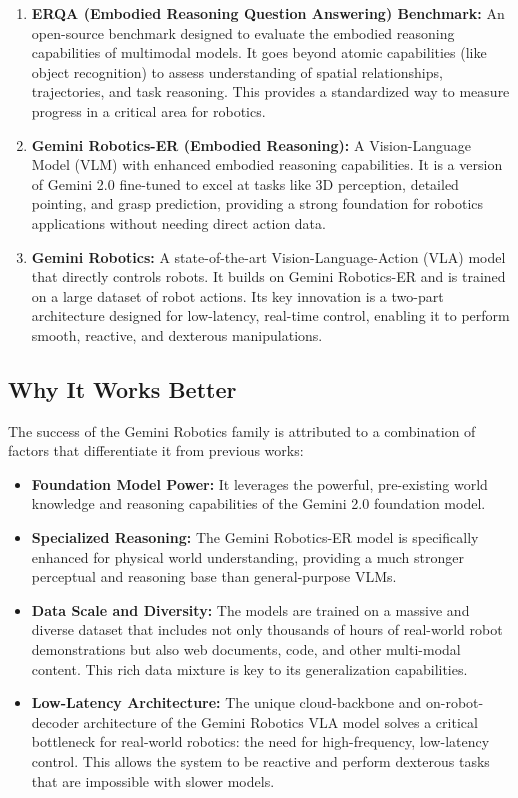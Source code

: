 \documentclass{article}
\begin{document}
\begin{enumerate}
    \item \textbf{ERQA (Embodied Reasoning Question Answering) Benchmark:} An open-source benchmark designed to evaluate the embodied reasoning capabilities of multimodal models. It goes beyond atomic capabilities (like object recognition) to assess understanding of spatial relationships, trajectories, and task reasoning. This provides a standardized way to measure progress in a critical area for robotics.

    \item \textbf{Gemini Robotics-ER (Embodied Reasoning):} A Vision-Language Model (VLM) with enhanced embodied reasoning capabilities. It is a version of Gemini 2.0 fine-tuned to excel at tasks like 3D perception, detailed pointing, and grasp prediction, providing a strong foundation for robotics applications without needing direct action data.

    \item \textbf{Gemini Robotics:} A state-of-the-art Vision-Language-Action (VLA) model that directly controls robots. It builds on Gemini Robotics-ER and is trained on a large dataset of robot actions. Its key innovation is a two-part architecture designed for low-latency, real-time control, enabling it to perform smooth, reactive, and dexterous manipulations.
\end{enumerate}

\subsection{Why It Works Better}
The success of the Gemini Robotics family is attributed to a combination of factors that differentiate it from previous works:
\begin{itemize}
    \item \textbf{Foundation Model Power:} It leverages the powerful, pre-existing world knowledge and reasoning capabilities of the Gemini 2.0 foundation model.
    \item \textbf{Specialized Reasoning:} The Gemini Robotics-ER model is specifically enhanced for physical world understanding, providing a much stronger perceptual and reasoning base than general-purpose VLMs.
    \item \textbf{Data Scale and Diversity:} The models are trained on a massive and diverse dataset that includes not only thousands of hours of real-world robot demonstrations but also web documents, code, and other multi-modal content. This rich data mixture is key to its generalization capabilities.
    \item \textbf{Low-Latency Architecture:} The unique cloud-backbone and on-robot-decoder architecture of the Gemini Robotics VLA model solves a critical bottleneck for real-world robotics: the need for high-frequency, low-latency control. This allows the system to be reactive and perform dexterous tasks that are impossible with slower models.
\end{itemize}
\end{document}
